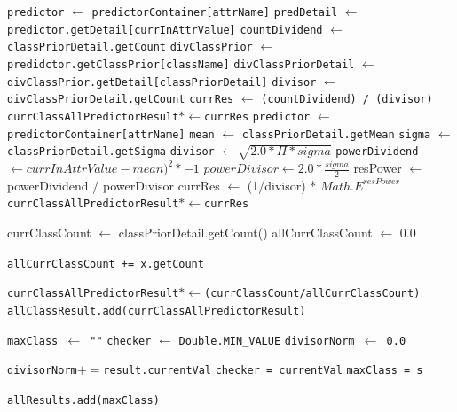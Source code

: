 \begin{enumerate}
\begin{itemize}
\begin{enumerate}
\begin{algorithm}[H]
\begin{algorithmic}[1]
							\State \texttt{predictor} $\gets$ \texttt{predictorContainer[attrName]}
							\State \texttt{predDetail} $\gets$ \texttt{predictor.getDetail[currInAttrValue]}
							\State \texttt{countDividend} $\gets$ \texttt{classPriorDetail.getCount}
							\State \texttt{divClassPrior} $\gets$ \texttt{predidctor.getClassPrior[className]}
							\State \texttt{divClassPriorDetail} $\gets$ \texttt{divClassPrior.getDetail[classPriorDetail]}
							\State \texttt{divisor} $\gets$ \texttt{divClassPriorDetail.getCount}
							\State \texttt{currRes} $\gets$ \texttt{(countDividend) / (divisor)}
							\State \texttt{currClassAllPredictorResult}$*\gets$\texttt{currRes}
							\State \texttt{predictor} $\gets$ \texttt{predictorContainer[attrName]}
							\State \texttt{mean} $\gets$ \texttt{classPriorDetail.getMean}
							\State \texttt{sigma} $\gets$ \texttt{classPriorDetail.getSigma}
							\State \texttt{divisor} $\gets \sqrt{2.0 * \Pi * sigma}$
							\State \texttt{powerDividend} $\gets currInAttrValue - mean)^2 * -1$
							\State $powerDivisor \gets 2.0 * \frac{sigma}{2}$
							\State resPower $\gets$ powerDividend / powerDivisor
							\State currRes $\gets$ (1/divisor) * $Math.E^{resPower}$
							\State \texttt{currClassAllPredictorResult}$*\gets$\texttt{currRes}
						\EndIf
						
						\State currClassCount $\gets$ classPriorDetail.getCount()
						\State allCurrClassCount $\gets$ 0.0

							\State \texttt{allCurrClassCount += x.getCount}
						\EndFor
												
						\State \texttt{currClassAllPredictorResult}$*\gets$\texttt{(currClassCount/allCurrClassCount)}
						\State \texttt{allClassResult.add(currClassAllPredictorResult)}
					\EndFor					
					
				\EndFor
				
				\State \texttt{maxClass $\gets$ ""}
				\State \texttt{checker} $\gets$ \texttt{Double.MIN}\verb|_|\texttt{VALUE}
				\State \texttt{divisorNorm $\gets$ 0.0}
				
					\State \texttt{divisorNorm}$+=$\texttt{result.currentVal}
						\State \texttt{checker = currentVal}
          				\State \texttt{maxClass = s}
					\EndIf
				\EndFor
				
				\State \texttt{allResults.add(maxClass)}
				

\end{algorithmic}
\end{algorithm}
\end{enumerate}
\end{itemize}
\end{enumerate}
